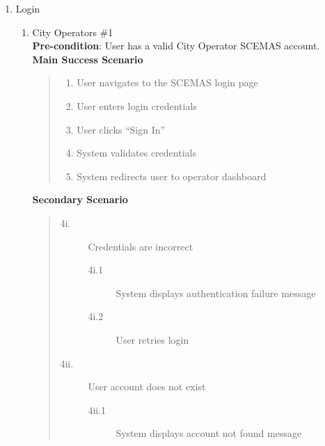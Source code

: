 \documentclass[]{article}
\begin{document}
\begin{enumerate}[{\bf BE10.}]
    \item Login
        \begin{enumerate}[{\bf VP1.}]
            \item City Operators \#1\\
                \textbf{Pre-condition}: User has a valid City Operator SCEMAS account.\\
                \textbf{Main Success Scenario}
                \begin{quote}
                    \begin{enumerate}[1.]
                        \item User navigates to the SCEMAS login page
                        \item User enters login credentials
                        \item User clicks ``Sign In''
                        \item System validates credentials
                        \item System redirects user to operator dashboard
                    \end{enumerate}
                \end{quote}
                \textbf{Secondary Scenario}
                \begin{quote}
                    \begin{description}
                        \item[\textmd{4i.}] Credentials are incorrect
                        \begin{description}
                            \item[\textmd{4i.1}] System displays authentication failure message
                            \item[\textmd{4i.2}] User retries login
                        \end{description}
                        \item[\textmd{4ii.}] User account does not exist
                        \begin{description}
                            \item[\textmd{4ii.1}] System displays account not found message
                        \end{description}
                    \end{description}
                \end{quote}


\end{enumerate}
\end{enumerate}
\end{document}
